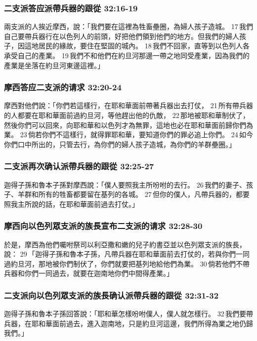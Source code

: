 \subsubsection{二支派答应派帶兵器的跟從 32:16-19}
兩支派的人挨近摩西，說：「我們要在這裡為牲畜壘圈，為婦人孩子造城。 17 我們自己要帶兵器行在以色列人的前頭，好把他們領到他們的地方。但我們的婦人孩子，因這地居民的緣故，要住在堅固的城內。 18 我們不回家，直等到以色列人各承受自己的產業。 19 我們不和他們在約旦河那邊一帶之地同受產業，因為我們的產業是坐落在約旦河東邊這裡。」

\subsubsection{摩西答应二支派的请求 32:20-24}
摩西對他們說：「你們若這樣行，在耶和華面前帶著兵器出去打仗， 21 所有帶兵器的人都要在耶和華面前過約旦河，等他趕出他的仇敵， 22 那地被耶和華制伏了，然後你們可以回來，向耶和華和以色列才為無罪，這地也必在耶和華面前歸你們為業。 23 倘若你們不這樣行，就得罪耶和華，要知道你們的罪必追上你們。 24 如今你們口中所出的，只管去行，為你們的婦人孩子造城，為你們的羊群壘圈。」

\subsubsection{二支派再次确认派帶兵器的跟從 32:25-27}
迦得子孫和魯本子孫對摩西說：「僕人要照我主所吩咐的去行。 26 我們的妻子、孩子、羊群和所有的牲畜都要留在基列的各城。 27 但你的僕人，凡帶兵器的，都要照我主所說的話，在耶和華面前過去打仗。」

\subsubsection{摩西向以色列眾支派的族長宣布二支派的请求 32:28-30}
於是，摩西為他們囑咐祭司以利亞撒和嫩的兒子約書亞並以色列眾支派的族長，說： 29 「迦得子孫和魯本子孫，凡帶兵器在耶和華面前去打仗的，若與你們一同過約旦河，那地被你們制伏了，你們就要把基列地給他們為業。 30 倘若他們不帶兵器和你們一同過去，就要在迦南地你們中間得產業。」

\subsubsection{二支派向以色列眾支派的族長确认派帶兵器的跟從 32:31-32}
迦得子孫和魯本子孫回答說：「耶和華怎樣吩咐僕人，僕人就怎樣行。 32 我們要帶兵器，在耶和華面前過去，進入迦南地，只是約旦河這邊，我們所得為業之地仍歸我們。」

